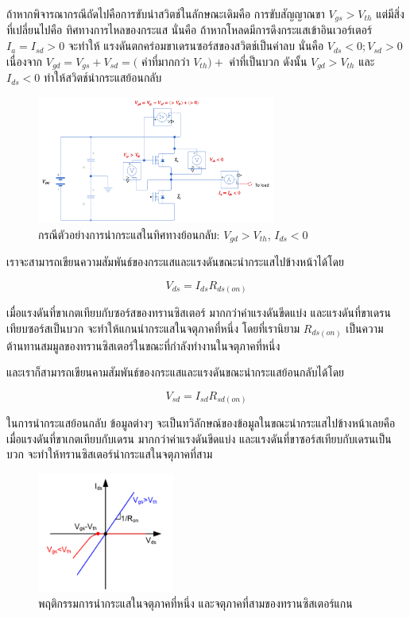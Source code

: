 \documentclass[11pt,a4paper]{article}
\begin{document}
ถ้าหากพิจารณากรณีถัดไปคือการขับนำสวิตช์ในลักษณะเดิมคือ การขับสัญญาณขา $V_{gs} > V_{th}$ แต่มีสิ่งที่เปลี่ยนไปคือ ทิศทางการไหลของกระแส นั่นคือ ถ้าหากโหลดมีการดึงกระแสเข้าอินเวอร์เตอร์ $I_a = I_{sd} >0$ จะทำให้ แรงดันตกคร่อมขาเดรนซอร์สของสวิตช์เป็นค่าลบ นั่นคือ $V_{ds} <0; V_{sd} > 0$ เนื่องจาก $V_{gd} = V_{gs} + V_{sd} =($ ค่าที่มากกว่า $V_{th})+$ ค่าที่เป็นบวก ดังนั้น $V_{gd} > V_{th}$ และ $I_{ds} < 0$ ทำให้สวิตช์นำกระแสย้อนกลับ

\begin{figure}[h!]
    \centering
    \includegraphics[width=0.7\textwidth]{inverter_q3.png}
    \caption{กรณีตัวอย่างการนำกระแสในทิศทางย้อนกลับ: $V_{gd} > V_{th}$, $I_{ds} < 0$}
    \label{inverter_q3}
\end{figure}

เราจะสามารถเขียนความสัมพันธ์ของกระแสและแรงดันขณะนำกระแสไปข้างหน้าได้โดย

\begin{equation}
    V_{ds} = I_{ds}R_{ds(on)}
\end{equation}

เมื่อแรงดันที่ขาเกตเทียบกับซอร์สของทรานซิสเตอร์ มากกว่าค่าแรงดันขีดแบ่ง และแรงดันที่ขาเดรนเทียบซอร์สเป็นบวก จะทำให้แกนนำกระแสในจตุภาคที่หนึ่ง โดยที่เรานิยาม $R_{ds(on)}$ เป็นความต้านทานสมมูลของทรานซิสเตอร์ในขณะที่กำลังทำงานในจตุภาคที่หนึ่ง

และเราก็สามารถเขียนคามสัมพันธ์ของกระแสและแรงดันขณะนำกระแสย้อนกลับได้โดย

\begin{equation}
    V_{sd} = I_{sd}R_{sd(on)}
\end{equation}

ในการนำกระแสย้อนกลับ ข้อมูลต่างๆ จะเป็นทวิลักษณ์ของข้อมูลในขณะนำกระแสไปข้างหน้าเลยคือ เมื่อแรงดันที่ขาเกตเทียบกับเดรน มากกว่าค่าแรงดันขีดแบ่ง และแรงดันที่ขาซอร์สเทียบกับเดรนเป็นบวก จะทำให้ทรานซิสเตอร์นำกระแสในจตุภาคที่สาม

\begin{figure}[h]
    \centering
    \includegraphics[width=0.4\textwidth]{gan_behavior.png}
    \caption{พฤติกรรมการนำกระแสในจตุภาคที่หนึ่ง และจตุภาคที่สามของทรานซิสเตอร์แกน}
    \label{gan_behavior}
\end{figure}
\end{document}

